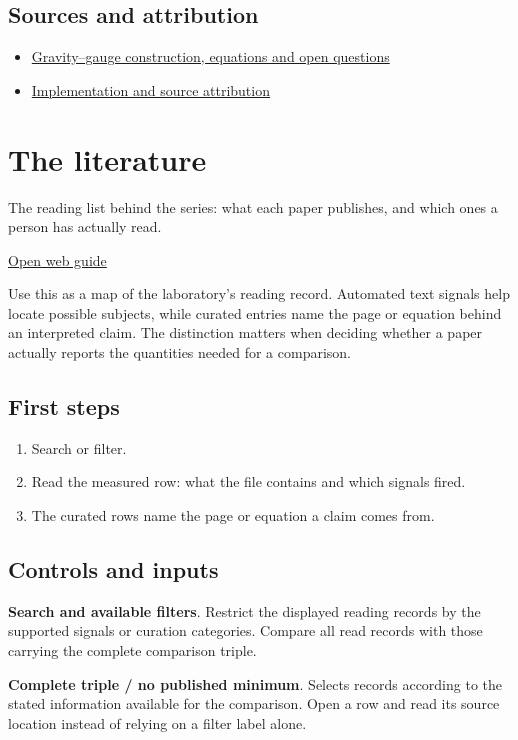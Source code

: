 \documentclass[11pt,a4paper]{article}
\begin{document}
\subsection*{Sources and attribution}
\begin{itemize}
\item \href{https://github.com/karlesmarin/ghu-lab/blob/main/src/modules/gravitygauge.mjs}{Gravity--gauge construction, equations and open questions}
\item \href{https://github.com/karlesmarin/ghu-lab/blob/main/src/sections/gravitygauge_section.js}{Implementation and source attribution}
\end{itemize}
\section{The literature}
The reading list behind the series: what each paper publishes, and which ones a person has actually read.

\href{https://karlesmarin.github.io/ghu-explorer/guide/litcensus/index.html}{Open web guide}

Use this as a map of the laboratory's reading record. Automated text signals help locate possible subjects, while curated entries name the page or equation behind an interpreted claim. The distinction matters when deciding whether a paper actually reports the quantities needed for a comparison.
\subsection*{First steps}
\begin{enumerate}
\item Search or filter.
\item Read the measured row: what the file contains and which signals fired.
\item The curated rows name the page or equation a claim comes from.
\end{enumerate}
\subsection*{Controls and inputs}
\textbf{Search and available filters}. Restrict the displayed reading records by the supported signals or curation categories. Compare all read records with those carrying the complete comparison triple.

\textbf{Complete triple / no published minimum}. Selects records according to the stated information available for the comparison. Open a row and read its source location instead of relying on a filter label alone.
\end{document}
